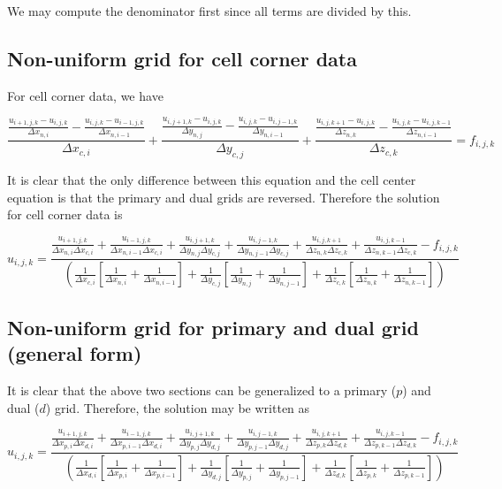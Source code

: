 \documentclass[11pt]{article}
\begin{document}
We may compute the denominator first since all terms are divided by this.


\subsection{Non-uniform grid for cell corner data}

For cell corner data, we have

\begin{equation}
	\frac{\frac{u_{i+1,j,k}-u_{i,j,k}}{\Delta x_{n,i}} - \frac{u_{i,j,k}-u_{i-1,j,k}}{\Delta x_{n,i-1}}}{\Delta x_{c,i}} + 
	\frac{\frac{u_{i,j+1,k}-u_{i,j,k}}{\Delta y_{n,j}} - \frac{u_{i,j,k}-u_{i,j-1,k}}{\Delta y_{n,i-1}}}{\Delta y_{c,j}} +
	\frac{\frac{u_{i,j,k+1}-u_{i,j,k}}{\Delta z_{n,k}} - \frac{u_{i,j,k}-u_{i,j,k-1}}{\Delta z_{n,i-1}}}{\Delta z_{c,k}} = f_{i,j,k}
\end{equation}

It is clear that the only difference between this equation and the cell center equation is that the primary and dual grids are reversed. Therefore the solution for cell corner data is

\begin{equation}
	u_{i,j,k} = 
	\frac{ 
	\frac{u_{i+1,j,k}}{\Delta x_{n,i} \Delta x_{c,i}} + \frac{u_{i-1,j,k}}{\Delta x_{n,i-1} \Delta x_{c,i}} + 
	\frac{u_{i,j+1,k}}{\Delta y_{n,j} \Delta y_{c,j}} + \frac{u_{i,j-1,k}}{\Delta y_{n,j-1} \Delta y_{c,j}} +
	\frac{u_{i,j,k+1}}{\Delta z_{n,k} \Delta z_{c,k}} + \frac{u_{i,j,k-1}}{\Delta z_{n,k-1} \Delta z_{c,k}}
	- f_{i,j,k} }{
	\left( 
	\frac{ 1 }{ \Delta x_{c,i} }
	\left[
	\frac{ 1 }{ \Delta x_{n,i} } +
	\frac{ 1 }{ \Delta x_{n,i-1} }
	\right] +
	\frac{ 1 }{ \Delta y_{c,j} }
	\left[
	\frac{ 1 }{ \Delta y_{n,j} } +
	\frac{ 1 }{ \Delta y_{n,j-1} }
	\right] +
	\frac{ 1 }{ \Delta z_{c,k} }
	\left[
	\frac{ 1 }{ \Delta z_{n,k} } +
	\frac{ 1 }{ \Delta z_{n,k-1} }
	\right]
	\right)
	}
\end{equation}


\subsection{Non-uniform grid for primary and dual grid (general form)}
It is clear that the above two sections can be generalized to a primary ($p$) and dual ($d$) grid. Therefore, the solution may be written as


\begin{equation}
	u_{i,j,k} = 
	\frac{ 
	\frac{u_{i+1,j,k}}{\Delta x_{p,i} \Delta x_{d,i}} + \frac{u_{i-1,j,k}}{\Delta x_{p,i-1} \Delta x_{d,i}} + 
	\frac{u_{i,j+1,k}}{\Delta y_{p,j} \Delta y_{d,j}} + \frac{u_{i,j-1,k}}{\Delta y_{p,j-1} \Delta y_{d,j}} +
	\frac{u_{i,j,k+1}}{\Delta z_{p,k} \Delta z_{d,k}} + \frac{u_{i,j,k-1}}{\Delta z_{p,k-1} \Delta z_{d,k}}
	- f_{i,j,k} }{
	\left( 
	\frac{ 1 }{ \Delta x_{d,i} }
	\left[
	\frac{ 1 }{ \Delta x_{p,i} } +
	\frac{ 1 }{ \Delta x_{p,i-1} }
	\right] +
	\frac{ 1 }{ \Delta y_{d,j} }
	\left[
	\frac{ 1 }{ \Delta y_{p,j} } +
	\frac{ 1 }{ \Delta y_{p,j-1} }
	\right] +
	\frac{ 1 }{ \Delta z_{d,k} }
	\left[
	\frac{ 1 }{ \Delta z_{p,k} } +
	\frac{ 1 }{ \Delta z_{p,k-1} }
	\right]
	\right)
	}
\end{equation}
\end{document}
